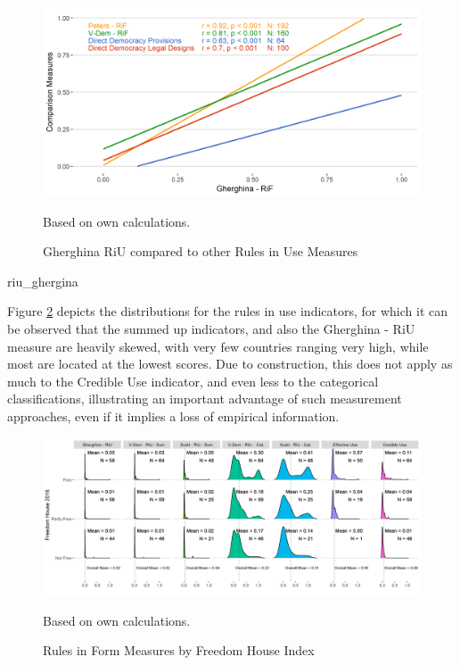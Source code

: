 \documentclass[]{article}
\begin{document}
\begin{figure}[!th]
    \caption{Gherghina RiU compared to other Rules in Use Measures}
    \label{riu_ghergina}
    \includegraphics[width=\textwidth]{images/rif_ghergina.png}
    \flushright
    {\scriptsize Based on own calculations. \par}
\end{figure}

riu\_ghergina

Figure \ref{coef_riu2} depicts the distributions for the rules in use
indicators, for which it can be observed that the summed up indicators,
and also the Gherghina - RiU measure are heavily skewed, with very few
countries ranging very high, while most are located at the lowest
scores. Due to construction, this does not apply as much to the Credible
Use indicator, and even less to the categorical classifications,
illustrating an important advantage of such measurement approaches, even
if it implies a loss of empirical information.

\begin{figure}[!th]
    \caption{Rules in Form Measures by Freedom House Index}
    \label{coef_riu2}
    \includegraphics[width=\textwidth]{images/coef_riu2.png}
    \flushright
    {\scriptsize Based on own calculations. \par}
\end{figure}
\end{document}
